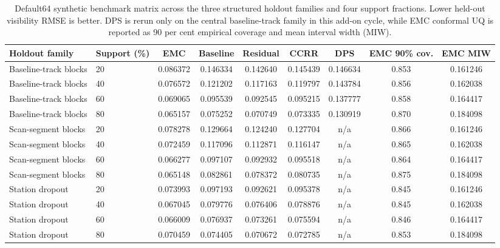 \begin{table}
\centering
\caption{Default64 synthetic benchmark matrix across the three structured holdout families and four support fractions. Lower held-out visibility RMSE is better. DPS is rerun only on the central baseline-track family in this add-on cycle, while EMC conformal UQ is reported as 90 per cent empirical coverage and mean interval width (MIW).}
\label{tab:benchmark-matrix}
\scriptsize
\setlength{\tabcolsep}{4pt}
\begin{tabular}{llccccccc}
\toprule
Holdout family & Support (\%) & EMC & Baseline & Residual & CCRR & DPS & EMC 90\% cov. & EMC MIW \\
\midrule
Baseline-track blocks & 20 & 0.086372 & 0.146334 & 0.142640 & 0.145439 & 0.146634 & 0.853 & 0.161246 \\
Baseline-track blocks & 40 & 0.076572 & 0.121202 & 0.117163 & 0.119797 & 0.143784 & 0.856 & 0.162038 \\
Baseline-track blocks & 60 & 0.069065 & 0.095539 & 0.092545 & 0.095215 & 0.137777 & 0.858 & 0.164417 \\
Baseline-track blocks & 80 & 0.065157 & 0.075252 & 0.070749 & 0.073335 & 0.130919 & 0.870 & 0.184098 \\
Scan-segment blocks & 20 & 0.078278 & 0.129664 & 0.124240 & 0.127704 & n/a & 0.866 & 0.161246 \\
Scan-segment blocks & 40 & 0.072459 & 0.117096 & 0.112871 & 0.116147 & n/a & 0.865 & 0.162038 \\
Scan-segment blocks & 60 & 0.066277 & 0.097107 & 0.092932 & 0.095518 & n/a & 0.864 & 0.164417 \\
Scan-segment blocks & 80 & 0.065148 & 0.082861 & 0.078372 & 0.080735 & n/a & 0.875 & 0.184098 \\
Station dropout & 20 & 0.073993 & 0.097193 & 0.092621 & 0.095378 & n/a & 0.845 & 0.161246 \\
Station dropout & 40 & 0.067045 & 0.079776 & 0.076406 & 0.078876 & n/a & 0.845 & 0.162038 \\
Station dropout & 60 & 0.066009 & 0.076937 & 0.073261 & 0.075594 & n/a & 0.846 & 0.164417 \\
Station dropout & 80 & 0.070459 & 0.074405 & 0.070672 & 0.072785 & n/a & 0.853 & 0.184098 \\
\bottomrule
\end{tabular}
\end{table}
